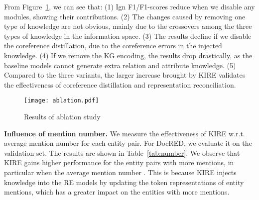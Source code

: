 \documentclass[runningheads]{llncs}
\begin{document}
From Figure~\ref{fig:ablation}, we can see that: 
(1) Ign F1/F1-scores reduce when we disable any modules, showing their contributions. 
(2) The changes caused by removing one type of knowledge are not obvious, mainly due to the crossovers among the three types of knowledge in the information space. 
(3) The results decline if we disable the coreference distillation, due to the coreference errors in the injected knowledge.
(4) If we remove the KG encoding, the results drop drastically, as the baseline models cannot generate extra relation and attribute knowledge. 
(5) Compared to the three variants, the larger increase brought by KIRE validates the effectiveness of coreference distillation and representation reconciliation.

\begin{figure}[!tb]
	\centering
	\texttt{[image: ablation.pdf]}
	\caption{Results of ablation study}
	\label{fig:ablation}
\end{figure}


\textbf{Influence of mention number.} We measure the effectiveness of KIRE w.r.t. average mention number for each entity pair. 
For DocRED, we evaluate it on the validation set.
The results are shown in Table~\ref{tab:number}. 
We observe that KIRE gains higher performance for the entity pairs with more mentions, in particular when the average mention number .
This is because KIRE injects knowledge into the RE models by updating the token representations of entity mentions, which has a greater impact on the entities with more mentions.
\end{document}
